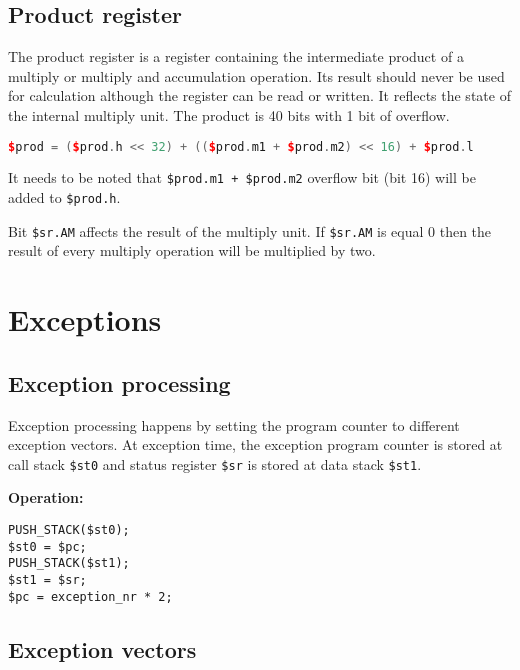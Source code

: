 \documentclass[oneside,english,a4paper,10pt,oneside,openany,final]{memoir}
\newcommand{\InlineExpression}[1]{\texttt{#1}}
\newcommand{\Register}[1]{\texttt{#1}}
\newcommand{\RegisterField}[1]{\texttt{#1}}
\begin{document}
\pagebreak{}

\section{Product register}

The product register is a register containing the intermediate product of a multiply or multiply and accumulation operation.
Its result should never be used for calculation although the register can be read or written.
It reflects the state of the internal multiply unit. The product is 40 bits with 1 bit of overflow.

\begin{lstlisting}[language=C++]
$prod = ($prod.h << 32) + (($prod.m1 + $prod.m2) << 16) + $prod.l
\end{lstlisting}

It needs to be noted that \InlineExpression{\$prod.m1 + \$prod.m2} overflow bit (bit 16) will be added to \Register{\$prod.h}.

Bit \RegisterField{\$sr.AM} affects the result of the multiply unit.
If \RegisterField{\$sr.AM} is equal 0 then the result of every multiply operation will be multiplied by two.

\pagebreak{}

\chapter{Exceptions}

\section{Exception processing}

Exception processing happens by setting the program counter to different exception vectors.
At exception time, the exception program counter is stored at call stack \Register{\$st0} and status register \Register{\$sr} is stored at data stack \Register{\$st1}.

\textbf{Operation:}
\begin{lstlisting}[basicstyle=\ttfamily]
PUSH_STACK($st0);
$st0 = $pc;
PUSH_STACK($st1);
$st1 = $sr;
$pc = exception_nr * 2;
\end{lstlisting}

\pagebreak{}

\section{Exception vectors}
\end{document}
